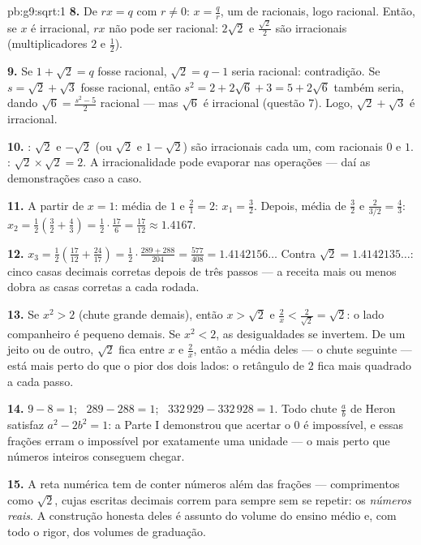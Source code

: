 \begin{solution}{pb:g9:sqrt:1}
\textbf{8.} De $r x = q$ com $r \neq 0$: $x = \frac qr$, um 
de racionais, logo racional. Então, se $x$ é irracional, $r x$ não pode
ser racional: $2\sqrt2$ e $\frac{\sqrt2}{2}$ são irracionais
(multiplicadores $2$ e $\frac12$).

\textbf{9.} Se $1 + \sqrt2 = q$ fosse racional, $\sqrt2 = q - 1$ seria
racional: contradição. Se $s = \sqrt2 + \sqrt3$ fosse racional, então
$s^2 = 2 + 2\sqrt6 + 3 = 5 + 2\sqrt6$ também seria, dando
$\sqrt6 = \frac{s^2 - 5}{2}$ racional --- mas $\sqrt6$ é irracional
(questão 7). Logo, $\sqrt2 + \sqrt3$ é irracional.

\textbf{10.} : $\sqrt2$ e $-\sqrt2$ (ou $\sqrt2$ e
$1 - \sqrt2$) são irracionais cada um, com  racionais $0$ e $1$.
: $\sqrt2 \times \sqrt2 = 2$. A irracionalidade pode evaporar
nas operações --- daí as demonstrações caso a caso.

\textbf{11.} A partir de $x = 1$: média de $1$ e $\frac21 = 2$:
$x_1 = \frac32$. Depois, média de $\frac32$ e $\frac{2}{3/2} =
\frac43$: $x_2 = \frac12\left(\frac32 + \frac43\right)
= \frac12 \cdot \frac{17}{6} = \frac{17}{12} \approx 1.4167$.

\textbf{12.} $x_3 = \frac12\left(\frac{17}{12} + \frac{24}{17}\right)
= \frac12 \cdot \frac{289 + 288}{204} = \frac{577}{408} =
1.4142156\ldots$ Contra $\sqrt2 = 1.4142135\ldots$: cinco casas
decimais corretas depois de três passos --- a receita mais ou menos
dobra as casas corretas a cada rodada.

\textbf{13.} Se $x^2 > 2$ (chute grande demais), então $x > \sqrt2$ e
$\frac2x < \frac{2}{\sqrt2} = \sqrt2$: o lado companheiro é pequeno
demais. Se $x^2 < 2$, as desigualdades se invertem. De um jeito ou de
outro, $\sqrt2$ fica entre $x$ e $\frac2x$, então a média deles --- o
chute seguinte --- está mais perto do que o pior dos dois lados: o
retângulo de  $2$ fica mais quadrado a cada passo.

\textbf{14.} $9 - 8 = 1$; \ $289 - 288 = 1$; \
$332\,929 - 332\,928 = 1$. Todo chute $\frac ab$ de Heron satisfaz
$a^2 - 2b^2 = 1$: a Parte I demonstrou que acertar o $0$ é impossível,
e essas frações erram o impossível por exatamente uma unidade --- o
mais perto que números inteiros conseguem chegar.

\textbf{15.} A reta numérica tem de conter números além das frações
--- comprimentos como $\sqrt2$, cujas escritas decimais correm para
sempre sem se repetir: os \emph{números reais}. A construção honesta
deles é assunto do volume do ensino médio e, com todo o rigor, dos
volumes de graduação.
\end{solution}
